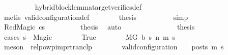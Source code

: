 \begin{isabellebody}
\ \ \ \ \ \ \ \ \isamarkupfalse%
\ hybrid{\isacharunderscore}{\kern0pt}block{\isacharunderscore}{\kern0pt}lemma{\isacharunderscore}{\kern0pt}target{\isacharunderscore}{\kern0pt}verifies{\isacharunderscore}{\kern0pt}def\isanewline
\ \ \ \ \ \ \ \ \isamarkupfalse%
\ {\isacharparenleft}{\kern0pt}metis\ valid{\isacharunderscore}{\kern0pt}configuration{\isacharunderscore}{\kern0pt}def{\isacharparenright}{\kern0pt}\isanewline
\ \ \ \ \ \ \isamarkupfalse%
\ {\isacharquery}{\kern0pt}thesis\isanewline
\ \ \ \ \ \ \ \ \isamarkupfalse%
\ simp\ \ \ \ \ \ \ \ \isanewline
\ \ \ \ \isamarkupfalse%
\isanewline
\ \ \ \ \ \ \isamarkupfalse%
\ {\isacharparenleft}{\kern0pt}RedMagic\ cs{\isacharparenright}{\kern0pt}\isanewline
\ \ \ \ \ \ \isamarkupfalse%
\ \isamarkupfalse%
\ {\isacharquery}{\kern0pt}thesis\ \isamarkupfalse%
\ auto\isanewline
\ \ \ \ \isamarkupfalse%
\isanewline
\ \ \ \ \isanewline
\ \ \ \ \isamarkupfalse%
\ {\isacharquery}{\kern0pt}thesis\isanewline
\ \ \ \ \isamarkupfalse%
\ {\isacharparenleft}{\kern0pt}cases\ {\isachardoublequoteopen}s{}\ {\isacharequal}{\kern0pt}\ Magic{\isachardoublequoteclose}{\isacharparenright}{\kern0pt}\isanewline
\ \ \ \ \ \ \isamarkupfalse%
\ True\isanewline
\ \ \ \ \ \ \isamarkupfalse%
\ {\isachardoublequoteopen}M{\isacharcomma}{\kern0pt}{\isasymLambda}{\isacharcomma}{\kern0pt}{\isasymGamma}{\isacharcomma}{\kern0pt}{\isasymOmega}{\isacharcomma}{\kern0pt}G\ {\isasymturnstile}{\isacharparenleft}{\kern0pt}b{\isacharcomma}{\kern0pt}\ s{}{\isacharparenright}{\kern0pt}\ {\isacharminus}{\kern0pt}n{\isasymrightarrow}{\isacharasterisk}{\kern0pt}\ {\isacharparenleft}{\kern0pt}m{\isacharprime}{\kern0pt}{\isacharcomma}{\kern0pt}\ s{\isacharprime}{\kern0pt}{\isacharparenright}{\kern0pt}{\isachardoublequoteclose}\isanewline
\ \ \ \ \ \ \ \ \isamarkupfalse%
\ {\isacharparenleft}{\kern0pt}meson\ {\isachardoublequoteopen}{}{\isachardoublequoteclose}{\isacharparenleft}{\kern0pt}{}{\isacharparenright}{\kern0pt}\ relpowp{\isacharunderscore}{\kern0pt}imp{\isacharunderscore}{\kern0pt}rtranclp{\isacharparenright}{\kern0pt}\isanewline
\ \ \ \ \ \ \isamarkupfalse%
\ {\isachardoublequoteopen}valid{\isacharunderscore}{\kern0pt}configuration\ {\isasymLambda}\ {\isasymGamma}\ {\isasymOmega}\ posts\ m{\isacharprime}{\kern0pt}\ s{\isacharprime}{\kern0pt}{\isachardoublequoteclose}\isanewline

\end{isabellebody}
